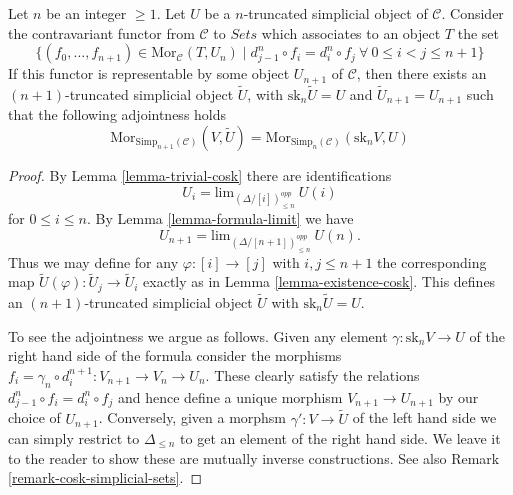 \begin{lemma}
\label{lemma-work-out}
Let $n$ be an integer $\geq 1$. Let $U$ be a $n$-truncated
simplicial object of $\mathcal{C}$. Consider the
contravariant functor from $\mathcal{C}$ to $\textit{Sets}$
which associates to an object $T$ the set
$$
\{ (f_0,\ldots,f_{n + 1}) \in \text{Mor}_{\mathcal{C}}(T, U_n)
\mid
d^n_{j - 1} \circ f_i = d^n_i \circ f_j\ 
\forall\ 0\leq i < j\leq n + 1\}
$$
If this functor is representable by some object $U_{n + 1}$
of $\mathcal{C}$, then there exists an $(n + 1)$-truncated
simplicial object $\tilde U$, with $\text{sk}_n \tilde U = U$
and $\tilde U_{n + 1} = U_{n + 1}$ such that the following
adjointness holds
$$
\text{Mor}_{\text{Simp}_{n + 1}(\mathcal{C})}(V, \tilde U)
=
\text{Mor}_{\text{Simp}_n(\mathcal{C})}(\text{sk}_nV, U)
$$
\end{lemma}

\begin{proof}
By Lemma \ref{lemma-trivial-cosk} there are identifications
$$
U_i = \text{lim}_{(\Delta/[i])_{\leq n}^{opp}}\ U(i)
$$
for $0 \leq i \leq n$. By Lemma \ref{lemma-formula-limit}
we have
$$
U_{n + 1} = \text{lim}_{(\Delta/[n + 1])_{\leq n}^{opp}}\ U(n).
$$
Thus we may define for any $\varphi : [i] \to [j]$
with $i, j \leq n + 1$ the corresponding map
$\tilde U(\varphi) : \tilde U_j \to \tilde U_i$ exactly as
in Lemma \ref{lemma-existence-cosk}. This defines
an $(n + 1)$-truncated simplicial object $\tilde U$
with $\text{sk}_n \tilde U = U$.

\medskip\noindent
To see the adjointness we argue as follows. Given any element
$\gamma : \text{sk}_n V \to U$ of the right hand side of the formula
consider the morphisms
$f_i = \gamma_n \circ d^{n+1}_i : V_{n+1} \to V_n \to U_n$.
These clearly satisfy the relations $d^n_{j - 1} \circ f_i = d^n_i \circ f_j$
and hence define a unique morphism $V_{n + 1} \to U_{n + 1}$
by our choice of $U_{n + 1}$.
Conversely, given a morphsm $\gamma' : V \to \tilde U$
of the left hand side we can simply restrict to
$\Delta_{\leq n}$ to get an element of the right hand side.
We leave it to the reader to show these are mutually inverse
constructions. See also
Remark \ref{remark-cosk-simplicial-sets}.
\end{proof}


